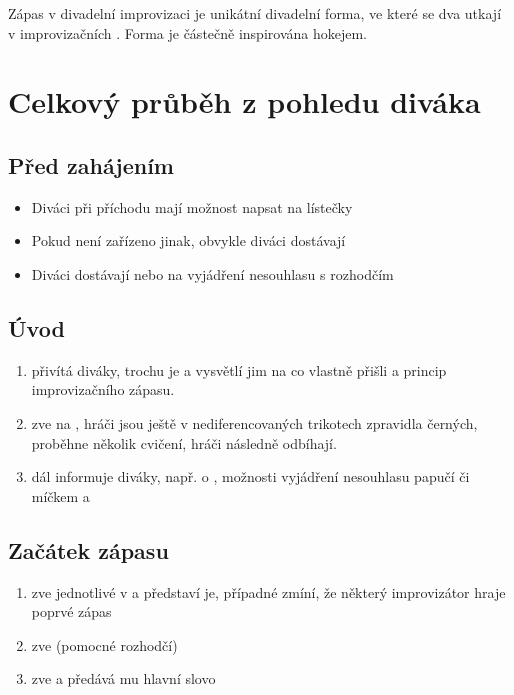 \documentclass[main.tex]{subfiles}
\begin{document}
\needspace{5cm} \label{zápas} Zápas v divadelní improvizaci je unikátní divadelní forma, ve které se dva  utkají v improvizačních .  
Forma je částečně inspirována hokejem. 
 
\section{ Celkový průběh z pohledu diváka }  
\subsection{ Před zahájením } \begin{itemize}
\item  Diváci při příchodu mají možnost napsat na lístečky 
\item  Pokud není zařízeno jinak, obvykle diváci dostávají 
\item  Diváci dostávají  nebo  na vyjádření nesouhlasu s rozhodčím
\end{itemize}
 
\subsection{ Úvod }   
\begin{enumerate}
\item  přivítá diváky, trochu je  a vysvětlí jim na co vlastně přišli a princip improvizačního zápasu.
\item  zve  na , hráči jsou ještě v nediferencovaných trikotech zpravidla černých, proběhne několik cvičení, hráči následně odbíhají.
\item  dál informuje diváky, např. o , možnosti vyjádření nesouhlasu papučí či míčkem a 
\end{enumerate}
 
\subsection{ Začátek zápasu }   
\begin{enumerate}
\item  zve jednotlivé  v  a představí je, případné zmíní, že některý improvizátor hraje poprvé zápas
\item  zve  (pomocné rozhodčí)
\item  zve  a předává mu hlavní slovo
\end{enumerate}
 
\end{document}
